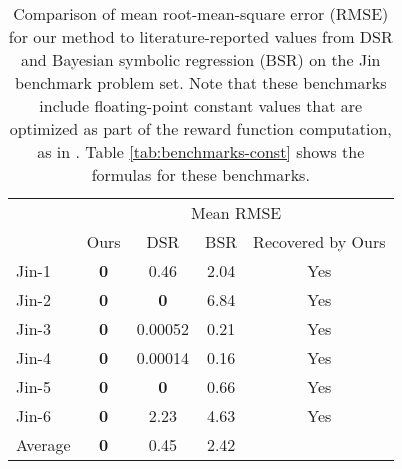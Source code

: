 \documentclass{article}
\begin{document}
\begin{table}[htbp]
  \centering
  \caption{Comparison of mean root-mean-square error (RMSE) for our method to literature-reported values from DSR \citep{petersen2019deep} and Bayesian symbolic regression (BSR) \citep{jin2019bayesian} on the Jin benchmark problem set.
  Note that these benchmarks include floating-point constant values that are optimized as part of the reward function computation, as in \citet{petersen2019deep}. Table \ref{tab:benchmarks-const} shows the formulas for these benchmarks. }
    \begin{tabular}{lcccc}
    & \multicolumn{4}{c}{Mean RMSE} \\
    & Ours & DSR & BSR & Recovered by Ours \\
    \cmidrule{2-5}
    Jin-1 & \textbf{0} & 0.46 & 2.04 & Yes \\
    Jin-2 & \textbf{0} & \textbf{0} & 6.84 & Yes \\
    Jin-3 & \textbf{0} & 0.00052 & 0.21 & Yes \\
    Jin-4 & \textbf{0} & 0.00014 & 0.16 & Yes \\
    Jin-5 & \textbf{0} & \textbf{0} & 0.66 & Yes \\
    Jin-6 & \textbf{0} & 2.23 & 4.63 & Yes \\
    \midrule
    Average & \textbf{0} & 0.45 & 2.42 & \\
    \end{tabular}
  \label{tab:jin}
\end{table}
\end{document}
